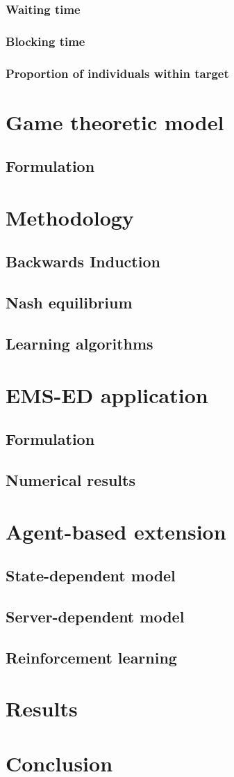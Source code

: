 \documentclass{article}
\begin{document}
            \subsubsection{Waiting time}
            \subsubsection{Blocking time}
            \subsubsection{Proportion of individuals within target}
    \section{Game theoretic model}
        \subsection{Formulation}
    \section{Methodology}
        \subsection{Backwards Induction}
        \subsection{Nash equilibrium}
        \subsection{Learning algorithms}
    \section{EMS-ED application}
        \subsection{Formulation}
        \subsection{Numerical results}
    \section{Agent-based extension}
        \subsection{State-dependent model}
        \subsection{Server-dependent model}
        \subsection{Reinforcement learning}
    \section{Results}
    \section{Conclusion}
\end{document}
